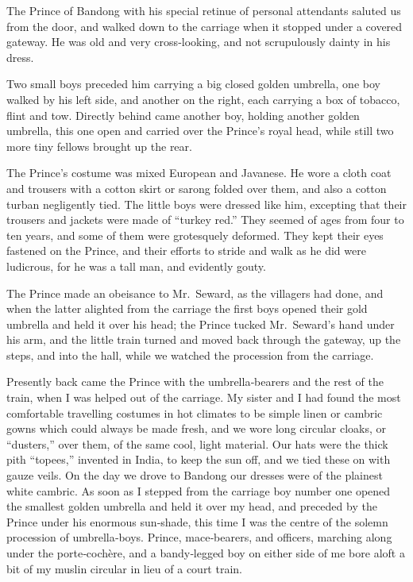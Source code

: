 \documentclass[12pt]{book}
\begin{document}
The Prince of Bandong with his special retinue of personal attendants saluted
us from the door, and walked down to the carriage when it stopped under a
covered gateway. He was old and very cross‐looking, and not scrupulously dainty
in his dress.

Two small boys preceded him carrying a big closed golden umbrella, one boy
walked by his left side, and another on the right, each carrying a box of tobacco,
flint and tow. Directly behind came another boy, holding another golden umbrella,
this one open and carried over the Prince’s royal head, while still two more tiny
fellows brought up the rear.

The Prince’s costume was mixed European and Javanese. He wore a cloth coat
and trousers with a cotton skirt or sarong folded over them, and also a cotton
turban negligently tied. The little boys were dressed like him, excepting that
their trousers and jackets were made of “turkey red.” They seemed of ages from
four to ten years, and some of them were grotesquely deformed. They kept their
eyes fastened on the Prince, and their efforts to stride and walk as he did were
ludicrous, for he was a tall man, and evidently gouty.

The Prince made an obeisance to Mr.~Seward, as the villagers had done, and
when the latter alighted from the carriage the first boys opened their gold umbrella
and held it over his head; the Prince tucked Mr.~Seward’s hand under his arm,
and the little train turned and moved back through the gateway, up the steps, and
into the hall, while we watched the procession from the carriage.

Presently back came the Prince with the umbrella‐bearers and the rest of the
train, when I was helped out of the carriage. My sister and I had found the most
comfortable travelling costumes in hot climates to be simple linen or cambric
gowns which could always be made fresh, and we wore long circular cloaks, or
“dusters,” over them, of the same cool, light material. Our hats were the thick pith
“topees,” invented in India, to keep the sun off, and we tied these on with gauze
veils. On the day we drove to Bandong our dresses were of the plainest white
cambric. As soon as I stepped from the carriage boy number one opened the
smallest golden umbrella and held it over my head, and preceded by the Prince
under his enormous sun‐shade, this time I was the centre of the solemn procession
of umbrella‐boys. Prince, mace‐bearers, and officers, marching along under the
porte‐cochère, and a bandy‐legged boy on either side of me bore aloft a bit of my
muslin circular in lieu of a court train.
\end{document}
